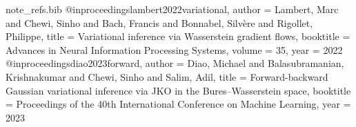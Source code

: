 \begin{filecontents*}[overwrite]{note_refs.bib}
@inproceedings{lambert2022variational,
  author    = {Lambert, Marc and Chewi, Sinho and Bach, Francis and Bonnabel, Silv\`ere and Rigollet, Philippe},
  title     = {Variational inference via {W}asserstein gradient flows},
  booktitle = {Advances in Neural Information Processing Systems},
  volume    = {35},
  year      = {2022}
}
@inproceedings{diao2023forward,
  author    = {Diao, Michael and Balasubramanian, Krishnakumar and Chewi, Sinho and Salim, Adil},
  title     = {Forward-backward {G}aussian variational inference via {JKO} in the {B}ures--{W}asserstein space},
  booktitle = {Proceedings of the 40th International Conference on Machine Learning},
  year      = {2023}
}
\end{filecontents*}

\documentclass[11pt]{article}

\usepackage[margin=1in]{geometry}
\usepackage{amsmath,amssymb,amsthm,mathtools}
\usepackage{bm}
\usepackage{xcolor}
\usepackage[numbers,sort&compress]{natbib}
\usepackage{hyperref}
\usepackage{aliascnt}
\usepackage[nameinlink,capitalize]{cleveref}

\usepackage{comment}

\hypersetup{
    colorlinks=true,
    linkcolor=blue!60!black,
    citecolor=blue!60!black,
    urlcolor=blue!60!black
}

\theoremstyle{plain}
\newtheorem{theorem}{Theorem}[section]

\newtheorem{proposition}[proposition]{Proposition}

\newtheorem{lemma}[lemma]{Lemma}

\newtheorem{corollary}[corollary]{Corollary}

\theoremstyle{definition}
\newtheorem{assumption}[assumption]{Assumption}

\newtheorem{definition}[definition]{Definition}

